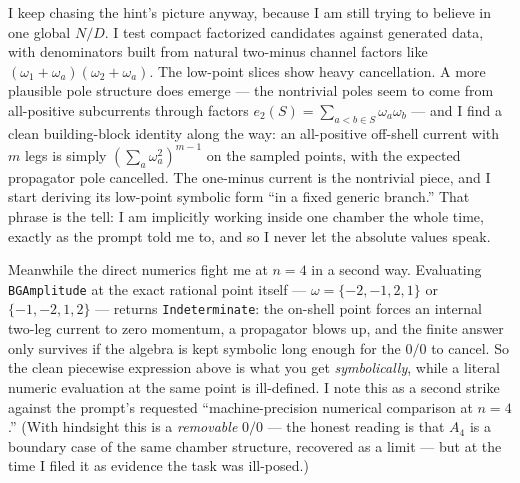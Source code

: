 \documentclass{article}
\begin{document}
I keep chasing the hint's picture anyway, because I am still trying to believe
in one global $N/D$. I test compact factorized candidates against generated
data, with denominators built from natural two-minus channel factors like
$(\omega_1+\omega_a)(\omega_2+\omega_a)$. The low-point slices show heavy
cancellation. A more plausible pole structure does emerge --- the nontrivial
poles seem to come from all-positive subcurrents through factors
$e_2(S)=\sum_{a<b\in S}\omega_a\omega_b$ --- and I find a clean building-block
identity along the way: an all-positive off-shell current with $m$ legs is
simply $(\sum_a\omega_a^2)^{m-1}$ on the sampled points, with the expected
propagator pole cancelled. The one-minus current is the nontrivial piece, and
I start deriving its low-point symbolic form ``in a fixed generic branch.''
That phrase is the tell: I am implicitly working inside one chamber the whole
time, exactly as the prompt told me to, and so I never let the absolute values
speak.

Meanwhile the direct numerics fight me at $n=4$ in a second way. Evaluating
\texttt{BGAmplitude} at the exact rational point itself --- $\omega=\{-2,-1,2,1\}$
or $\{-1,-2,1,2\}$ --- returns \texttt{Indeterminate}: the on-shell point forces
an internal two-leg current to zero momentum, a propagator blows up, and the
finite answer only survives if the algebra is kept symbolic long enough for the
$0/0$ to cancel. So the clean piecewise expression above is what you get
\emph{symbolically}, while a literal numeric evaluation at the same point is
ill-defined. I note this as a second strike against the prompt's requested
``machine-precision numerical comparison at $n=4$.'' (With hindsight this is a
\emph{removable} $0/0$ --- the honest reading is that $A_4$ is a boundary case
of the same chamber structure, recovered as a limit --- but at the time I
filed it as evidence the task was ill-posed.)
\end{document}
